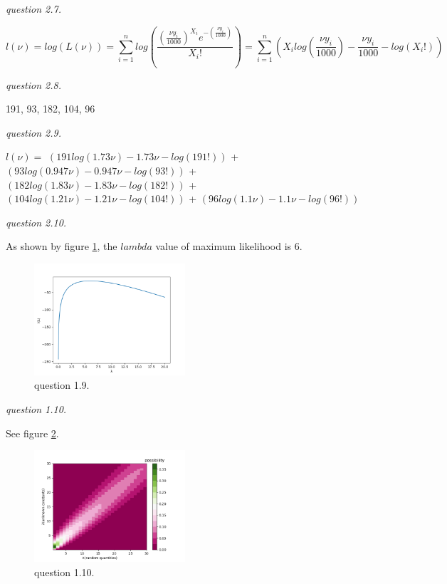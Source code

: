 \documentclass{article}
\begin{document}
\vspace{\baselineskip}
\textit{question 2.7.}

$$l(\nu)=log(L(\nu))=\sum_{i=1}^nlog(\frac{{(\frac{\nu y_i}{1000})}^{X_i}e^{-(\frac{\nu y_i}{1000})}}{X_i!})=
\sum_{i=1}^n(X_ilog(\frac{\nu y_i}{1000}) - \frac{\nu y_i}{1000} - log(X_i!))$$

\vspace{\baselineskip}
\textit{question 2.8.}

191, 93, 182, 104, 96

\vspace{\baselineskip}
\textit{question 2.9.}

$l(\nu)=$
$(191log(1.73\nu) - 1.73\nu - log(191!))$ + 
$(93log(0.947\nu) - 0.947\nu - log(93!))$ +
$(182log(1.83\nu) - 1.83\nu - log(182!))$ +
$(104log(1.21\nu) - 1.21\nu - log(104!))$ +
$(96log(1.1\nu) - 1.1\nu - log(96!))$

\vspace{\baselineskip}
\textit{question 2.10.}

As shown by figure \ref{fig:1-9}, the $lambda$ value of maximum likelihood is 6.

\begin{figure}[h!]
  \centering
  \includegraphics[width=0.5\textwidth]{1-9}
  \caption{question 1.9.}
  \label{fig:1-9}
\end{figure}

\vspace{\baselineskip}
\textit{question 1.10.}

See figure \ref{fig:1-10}.

\begin{figure}[h!]
  \centering
  \includegraphics[width=0.5\textwidth]{1-10}
  \caption{question 1.10.}
  \label{fig:1-10}
\end{figure}
\end{document}
